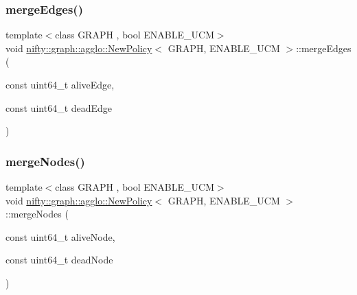 \mbox{\label{classnifty_1_1graph_1_1agglo_1_1NewPolicy_a775d22ce7efed5178d851e5ffded73c9}} 
\subsubsection{\texorpdfstring{merge\+Edges()}{mergeEdges()}}
{\footnotesize\ttfamily template$<$class G\+R\+A\+PH , bool E\+N\+A\+B\+L\+E\+\_\+\+U\+CM$>$ \\
void \hyperlink{classnifty_1_1graph_1_1agglo_1_1NewPolicy}{nifty\+::graph\+::agglo\+::\+New\+Policy}$<$ G\+R\+A\+PH, E\+N\+A\+B\+L\+E\+\_\+\+U\+CM $>$\+::merge\+Edges (\begin{DoxyParamCaption}\item[{const uint64\+\_\+t}]{alive\+Edge,  }\item[{const uint64\+\_\+t}]{dead\+Edge }\end{DoxyParamCaption})\hspace{0.3cm}{\ttfamily [inline]}}

\mbox{\label{classnifty_1_1graph_1_1agglo_1_1NewPolicy_a522b44525f9dfd9cd68c97c1e5626cec}} 
\subsubsection{\texorpdfstring{merge\+Nodes()}{mergeNodes()}}
{\footnotesize\ttfamily template$<$class G\+R\+A\+PH , bool E\+N\+A\+B\+L\+E\+\_\+\+U\+CM$>$ \\
void \hyperlink{classnifty_1_1graph_1_1agglo_1_1NewPolicy}{nifty\+::graph\+::agglo\+::\+New\+Policy}$<$ G\+R\+A\+PH, E\+N\+A\+B\+L\+E\+\_\+\+U\+CM $>$\+::merge\+Nodes (\begin{DoxyParamCaption}\item[{const uint64\+\_\+t}]{alive\+Node,  }\item[{const uint64\+\_\+t}]{dead\+Node }\end{DoxyParamCaption})\hspace{0.3cm}{\ttfamily [inline]}}

